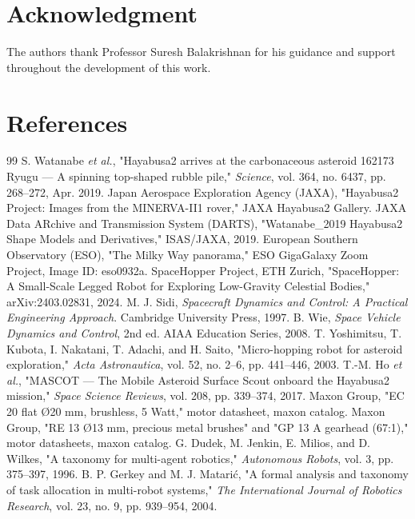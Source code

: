 \documentclass[conference]{IEEEtran}
\begin{document}
\section*{Acknowledgment}

The authors thank Professor Suresh Balakrishnan for his guidance and support throughout the development of this work.

\section*{References}

\begin{thebibliography}{99}
 S. Watanabe \emph{et al.}, "Hayabusa2 arrives at the carbonaceous asteroid 162173 Ryugu --- A spinning top-shaped rubble pile," \emph{Science}, vol. 364, no. 6437, pp. 268--272, Apr. 2019.
 Japan Aerospace Exploration Agency (JAXA), "Hayabusa2 Project: Images from the MINERVA-II1 rover," JAXA Hayabusa2 Gallery.
 JAXA Data ARchive and Transmission System (DARTS), "Watanabe\_2019 Hayabusa2 Shape Models and Derivatives," ISAS/JAXA, 2019.
 European Southern Observatory (ESO), "The Milky Way panorama," ESO GigaGalaxy Zoom Project, Image ID: eso0932a.
 SpaceHopper Project, ETH Zurich, "SpaceHopper: A Small-Scale Legged Robot for Exploring Low-Gravity Celestial Bodies," arXiv:2403.02831, 2024.
 M. J. Sidi, \emph{Spacecraft Dynamics and Control: A Practical Engineering Approach}. Cambridge University Press, 1997.
 B. Wie, \emph{Space Vehicle Dynamics and Control}, 2nd ed. AIAA Education Series, 2008.
 T. Yoshimitsu, T. Kubota, I. Nakatani, T. Adachi, and H. Saito, "Micro-hopping robot for asteroid exploration," \emph{Acta Astronautica}, vol. 52, no. 2--6, pp. 441--446, 2003.
 T.-M. Ho \emph{et al.}, "MASCOT --- The Mobile Asteroid Surface Scout onboard the Hayabusa2 mission," \emph{Space Science Reviews}, vol. 208, pp. 339--374, 2017.
 Maxon Group, "EC 20 flat \O{}20 mm, brushless, 5 Watt," motor datasheet, maxon catalog.
 Maxon Group, "RE 13 \O{}13 mm, precious metal brushes" and "GP 13 A gearhead (67:1)," motor datasheets, maxon catalog.
 G. Dudek, M. Jenkin, E. Milios, and D. Wilkes, "A taxonomy for multi-agent robotics," \emph{Autonomous Robots}, vol. 3, pp. 375--397, 1996.
 B. P. Gerkey and M. J. Matari\'c, "A formal analysis and taxonomy of task allocation in multi-robot systems," \emph{The International Journal of Robotics Research}, vol. 23, no. 9, pp. 939--954, 2004.

\end{thebibliography}
\end{document}
